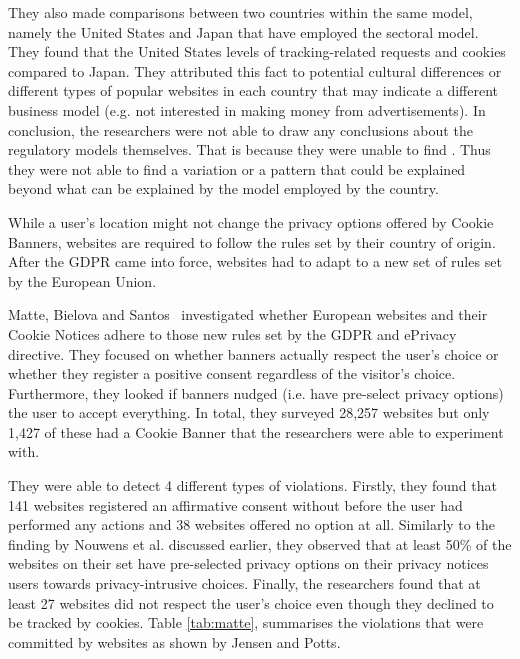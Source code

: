 \documentclass[../main.tex]{subfiles}
\begin{document}
They also made comparisons between two countries within the same model, namely the United States and Japan that have employed the sectoral model. They found that the United States  levels of tracking-related requests and cookies compared to Japan. They attributed this fact to potential cultural differences or different types of popular websites in each country that may indicate a different business model (e.g. not interested in making money from advertisements). In conclusion, the researchers were not able to draw any conclusions about the regulatory models themselves. That is because they were unable to find . Thus they were not able to find a variation or a pattern that could be explained beyond what can be explained by the model employed by the country. 

While a user’s location might not change the privacy options offered by Cookie Banners, websites are required to follow the rules set by their country of origin. After the GDPR came into force, websites had to adapt to a new set of rules set by the European Union. 

Matte, Bielova and Santos~\cite{matte2019cookie} investigated whether European websites and their Cookie Notices adhere to those new rules set by the GDPR and ePrivacy directive. They focused on whether banners actually respect the user’s choice or whether they register a positive consent regardless of the visitor’s choice. Furthermore, they looked if banners nudged (i.e. have pre-select privacy options) the user to accept everything. In total, they surveyed 28,257 websites but only 1,427 of these had a Cookie Banner that the researchers were able to experiment with. 

They were able to detect 4 different types of violations. Firstly, they found that 141 websites registered an affirmative consent without before the user had performed any actions and 38 websites offered no  option at all. Similarly to the finding by Nouwens et al. discussed earlier, they observed that at least 50\% of the websites on their set have pre-selected privacy options on their privacy notices  users towards privacy-intrusive choices. Finally, the researchers found that at least 27 websites did not respect the user’s choice even though they declined to be tracked by cookies. Table \ref{tab:matte}, summarises the violations that were committed by websites as shown by Jensen and Potts. 
\end{document}
